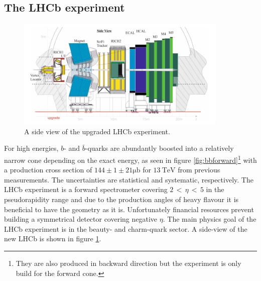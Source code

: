 \subsection{The LHCb experiment}
\label{sec:upgradeLHCb}

\begin{figure}
  \centering
  \includegraphics[width=0.9\textwidth]{plots/LHCb_facility.png}
  \caption{A side view of the upgraded LHCb experiment\cite{facilityLHCb}.}
  \label{fig:LHCb}
\end{figure}

For high energies, $b$- and $\bar{b}$-quarks are abundantly boosted into a relatively narrow cone depending on the exact energy, as seen in figure \ref{fig:bbforward}\footnote{They are also produced in backward direction but the experiment is only build for the forward cone.} with a production cross section of $144 \pm 1 \pm 21 \si{\micro\barn}$ \cite{bbXsection} for $\SI{13}{\tera\electronvolt}$ from previous measurements.
The uncertainties are statistical and systematic, respectively.
The LHCb experiment\cite{lhcbInfo} is a forward spectrometer covering $2 \,<\, \eta \,<\, 5$ in the pseudorapidity range and due to the production angles of heavy flavour it is beneficial to have the geometry as it is. Unfortunately financial resources prevent building a symmetrical detector covering negative $\eta$. The main physics goal of the LHCb experiment is in the beauty- and charm-quark sector. A side-view of the new LHCb is shown in figure \ref{fig:LHCb}.

